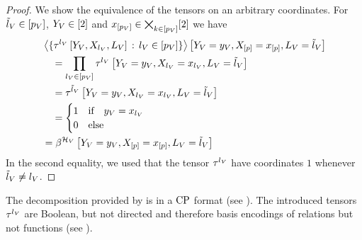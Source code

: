 \begin{proof}
    We show the equivalence of the tensors on an arbitrary coordinates.
    For $\tilde{l}_{V}\in[p_{V}]$, $Y_{V}\in[2]$ and $x_{[p_{V}]}\in\bigtimes_{k\in[p_{V}]}[2]$ we have
    \begin{align*}
        & \left\langle 
            \{\tau^{{l_{V}}}\left[Y_{V},X_{l_{V}},L_{V}\right] \, : \, l_{V}\in[p_{V}]\}
        \right\rangle \left[ Y_{V}=y_{V},X_{[p]}=x_{[p]},L_{V} = \tilde{l}_{V} \right] \\
        & \quad =
        \prod_{l_{V}\in[p_{V}]} \tau^{{l_{V}}}\left[
            Y_{V}=y_{V},X_{l_{V}}=x_{l_{V}},L_{V}=\tilde{l}_{V}
        \right] \\
        & \quad = \tau^{{\tilde{l}_{V}}}\left[
            Y_{V}=y_{V},X_{l_{V}}=x_{l_{V}},L_{V}=\tilde{l}_{V}
        \right] \\
        & \quad =
        \begin{cases}
            1 & \text{if} \quad y_{V} = x_{l_{V}} \\
            0 & \text{else}
        \end{cases} \\
        & = \beta^{\mathcal{H}_{V}}\left[Y_{V}=y_{V},X_{[p]}=x_{[p]},L_{V}=\tilde{l}_{V}\right]
    \end{align*}
    In the second equality, we used that the tensor $\tau^{{l_{V}}}$ have coordinates $1$ whenever $\tilde{l}_{V}\neq l_{V}$.
\end{proof}

The decomposition provided by  is in a $\mathrm{CP}$ format (see ).
The introduced tensors $\tau^{{l_{V}}}$ are Boolean, but not directed and therefore basis encodings of relations but not functions (see ).

